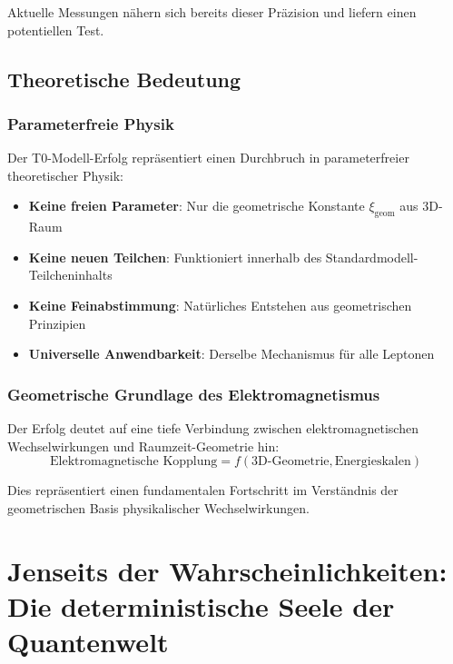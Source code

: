 \documentclass[12pt,a4paper]{report}
\newcommand{\xigeom}{\xi_{\text{geom}}}   %
\begin{document}
Aktuelle Messungen nähern sich bereits dieser Präzision und liefern einen potentiellen Test.

\section{Theoretische Bedeutung}
\label{sec:theoretical_significance}

\subsection{Parameterfreie Physik}
\label{subsec:parameter_free_physics}

Der T0-Modell-Erfolg repräsentiert einen Durchbruch in parameterfreier theoretischer Physik:
\begin{itemize}
	\item \textbf{Keine freien Parameter}: Nur die geometrische Konstante $\xigeom$ aus 3D-Raum
	\item \textbf{Keine neuen Teilchen}: Funktioniert innerhalb des Standardmodell-Teilcheninhalts
	\item \textbf{Keine Feinabstimmung}: Natürliches Entstehen aus geometrischen Prinzipien
	\item \textbf{Universelle Anwendbarkeit}: Derselbe Mechanismus für alle Leptonen
\end{itemize}

\subsection{Geometrische Grundlage des Elektromagnetismus}
\label{subsec:geometric_electromagnetism}

Der Erfolg deutet auf eine tiefe Verbindung zwischen elektromagnetischen Wechselwirkungen und Raumzeit-Geometrie hin:
\begin{equation}
	\text{Elektromagnetische Kopplung} = f(\text{3D-Geometrie}, \text{Energieskalen})
	\label{eq:electromagnetic_geometry}
\end{equation}

Dies repräsentiert einen fundamentalen Fortschritt im Verständnis der geometrischen Basis physikalischer Wechselwirkungen.


\chapter{Jenseits der Wahrscheinlichkeiten: Die deterministische Seele der Quantenwelt}
\label{chap:deterministic_qm}
\end{document}
